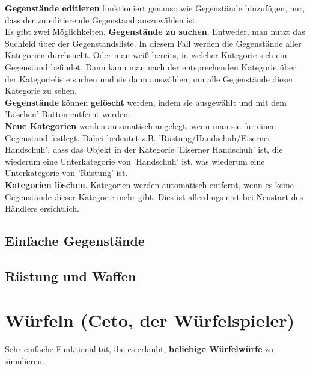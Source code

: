 \documentclass[11pt, a4paper, german]{article}
\begin{document}
\textbf{Gegenstände editieren} funktioniert genauso wie Gegenstände hinzufügen, nur, dass der zu editierende Gegenstand auszuwählen ist.\\

Es gibt zwei Möglichkeiten, \textbf{Gegenstände zu suchen}. Entweder, man nutzt das Suchfeld über der Gegenstandsliste. In diesem Fall werden die Gegenstände aller Kategorien durchsucht. Oder man weiß bereits, in welcher Kategorie sich ein Gegenstand befindet. Dann kann man nach der entsprechenden Kategorie über der Kategorieliste suchen und sie dann auswählen, um alle Gegenstände dieser Kategorie zu sehen. \\

\textbf{Gegenstände} können \textbf{gelöscht} werden, indem sie ausgewählt und mit dem 'Löschen'-Button entfernt werden.\\

\textbf{Neue Kategorien} werden automatisch angelegt, wenn man sie für einen Gegenstand festlegt. Dabei bedeutet z.B. 'Rüstung/Handschuh/Eiserner Handschuh', dass das Objekt in der Kategorie 'Eiserner Handschuh' ist, die wiederum eine Unterkategorie von 'Handschuh' ist, was wiederum eine Unterkategorie von 'Rüstung' ist.\\

\textbf{Kategorien löschen}. Kategorien werden automatisch entfernt, wenn es keine Gegenstände dieser Kategorie mehr gibt. Dies ist allerdings erst bei Neustart des Händlers ersichtlich.\\
\subsection{Einfache Gegenstände}
\subsection{Rüstung und Waffen}

\clearpage
\section{Würfeln (Ceto, der Würfelspieler)}
Sehr einfache Funktionalität, die es erlaubt, \textbf{beliebige Würfelwürfe} zu simulieren.
\end{document}
